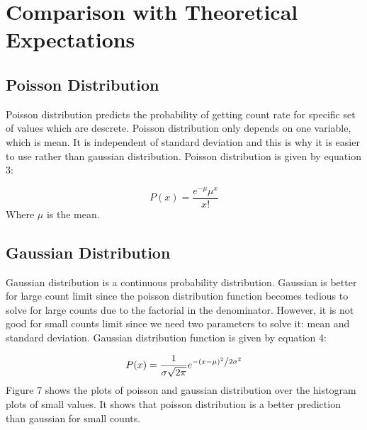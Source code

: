 \documentclass[letterpaper,12pt]{article}
\begin{document}
\section{Comparison with Theoretical Expectations}
\label{sec:comparison with theoretical expectations}
\subsection{Poisson Distribution}
\label{sec:poisson distribution}
Poisson distribution predicts the probability of getting count rate for specific set of values which are descrete. Poisson distribution only depends on one variable, which is mean. It is independent of standard deviation and this is why it is easier to use rather than gaussian distribution. Poisson distribution is given by equation 3:

\begin{equation} \label{poisson} P\left( x \right) = \frac{{e^{ - \mu } \mu ^x }}{{x!}} \end{equation}
Where \begin{math}\mu \end{math} is the mean. 

\subsection{Gaussian Distribution}
\label{sec:gaussian distribution}
Gaussian distribution is a continuous probability distribution. Gaussian is better for large count limit since the poisson distribution function becomes tedious to solve for large counts due to the factorial in the denominator. However, it is not good for small counts limit since we need two parameters to solve it: mean and standard deviation.
Gaussian distribution function is given by equation 4:

\begin{equation}
\label{gaussian}
P(x) = \frac{1}{{\sigma \sqrt {2\pi } }}e^{{{ - \left( {x - \mu } \right)^2 } \mathord{\left/ {\vphantom {{ - \left( {x - \mu } \right)^2 } {2\sigma ^2 }}} \right. \kern-\nulldelimiterspace} {2\sigma ^2 }}}
\end{equation}
Figure 7 shows the plots of poisson and gaussian distribution over the histogram plots of small values. It shows that poisson distribution is a better prediction than gaussian for small counts.
\end{document}
